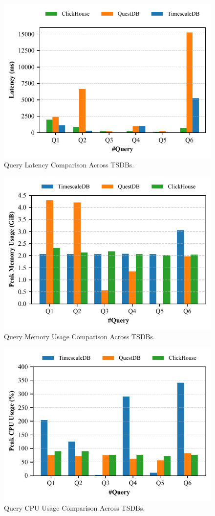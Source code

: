 \documentclass[conference]{IEEEtran}
\begin{document}
\begin{figure}[tb]
\centering
\includegraphics[width=0.8\linewidth]{1_query_latency_ieee.pdf}
\caption{Query Latency Comparison Across TSDBs.}
\label{fig:query_latency_comparison}
\end{figure}

\begin{figure}[tb]
\centering
\includegraphics[width=0.8\linewidth]{2_query_memory.pdf}
\caption{Query Memory Usage Comparison Across TSDBs.}
\label{fig:query_memory_comparison}
\end{figure}

\begin{figure}[tb]
\centering
\includegraphics[width=0.8\linewidth]{3_query_cpu.pdf}
\caption{Query CPU Usage Comparison Across TSDBs.}
\label{fig:query_cpu_comparison}
\end{figure}
\end{document}
